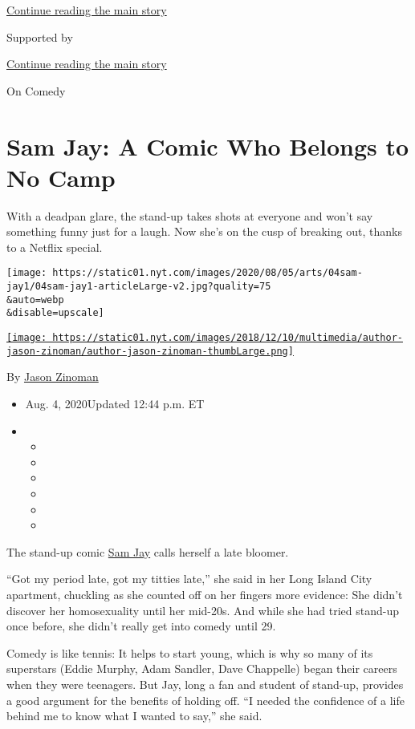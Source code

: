 \protect\hyperlink{after-top}{Continue reading the main story}

Supported by

\protect\hyperlink{after-sponsor}{Continue reading the main story}

On Comedy

\hypertarget{sam-jay-a-comic-who-belongs-to-no-camp}{%
\section{Sam Jay: A Comic Who Belongs to No
Camp}\label{sam-jay-a-comic-who-belongs-to-no-camp}}

With a deadpan glare, the stand-up takes shots at everyone and won't say
something funny just for a laugh. Now she's on the cusp of breaking out,
thanks to a Netflix special.

\texttt{[image: https://static01.nyt.com/images/2020/08/05/arts/04sam-jay1/04sam-jay1-articleLarge-v2.jpg?quality=75\\\&auto=webp\\\&disable=upscale]}

\href{https://www.nytimes.com/by/jason-zinoman}{\texttt{[image: https://static01.nyt.com/images/2018/12/10/multimedia/author-jason-zinoman/author-jason-zinoman-thumbLarge.png]}}

By \href{https://www.nytimes.com/by/jason-zinoman}{Jason Zinoman}

\begin{itemize}
\item
  Aug. 4, 2020Updated 12:44 p.m. ET
\item
  \begin{itemize}
  \item
  \item
  \item
  \item
  \item
  \item
  \end{itemize}
\end{itemize}

The stand-up comic \href{https://samjaycomic.com/}{Sam Jay} calls
herself a late bloomer.

``Got my period late, got my titties late,'' she said in her Long Island
City apartment, chuckling as she counted off on her fingers more
evidence: She didn't discover her homosexuality until her mid-20s. And
while she had tried stand-up once before, she didn't really get into
comedy until 29.

Comedy is like tennis: It helps to start young, which is why so many of
its superstars (Eddie Murphy, Adam Sandler, Dave Chappelle) began their
careers when they were teenagers. But Jay, long a fan and student of
stand-up, provides a good argument for the benefits of holding off. ``I
needed the confidence of a life behind me to know what I wanted to
say,'' she said.

